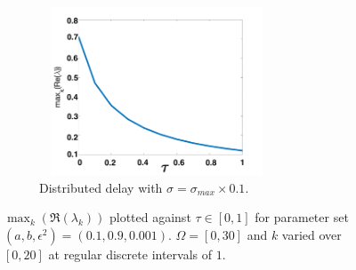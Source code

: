 \documentclass[12pt]{report}
\begin{document}
\begin{figure}[H]
\begin{subfigure}[b]{0.45\textwidth}
        \includegraphics[width=7cm,height=5cm]{p2sigmax10.png}
        \caption{Distributed delay with $\sigma=\sigma_{max}\times0.1$.}
        \label{}
    \end{subfigure}
    \caption{$\max_k(\Re(\lambda_k))$ plotted against $\tau\in[0,1]$ for parameter set $(a,b,\epsilon^2)=(0.1,0.9,0.001)$. $\Omega=[0,30]$ and $k$ varied over $[0,20]$ at regular discrete intervals of $1$.}
    \label{fig:p2}
\end{figure}
\end{document}
